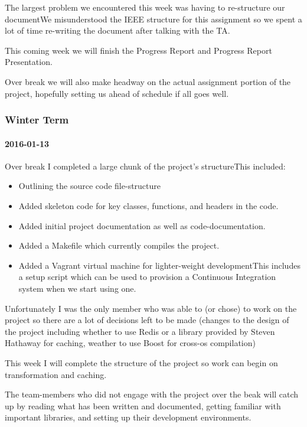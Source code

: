 The largest problem we encountered this week was having to re-structure our documentWe misunderstood the IEEE structure for this assignment so we spent a lot of time re-writing the document after talking with the TA.

This coming week we will finish the Progress Report and Progress Report Presentation.

Over break we will also make headway on the actual assignment portion of the project, hopefully setting us ahead of schedule if all goes well.

\subsubsection{Winter Term}

\paragraph{2016-01-13}

Over break I completed a large chunk of the project's structureThis included:

\begin{itemize}
  \item Outlining the source code file-structure
  \item Added skeleton code for key classes, functions, and headers in the code.
  \item Added initial project documentation as well as code-documentation.
  \item Added a Makefile which currently compiles the project.
  \item Added a Vagrant virtual machine for lighter-weight developmentThis includes a setup script which can be used to provision a Continuous Integration system when we start using one.
\end{itemize}

Unfortunately I was the only member who was able to (or chose) to work on the project so there are a lot of decisions left to be made (changes to the design of the project including whether to use Redis or a library provided by Steven Hathaway for caching, weather to use Boost for cross-os compilation)

This week I will complete the structure of the project so work can begin on transformation and caching.

The team-members who did not engage with the project over the beak will catch up by reading what has been written and documented, getting familiar with important libraries, and setting up their development environments.

